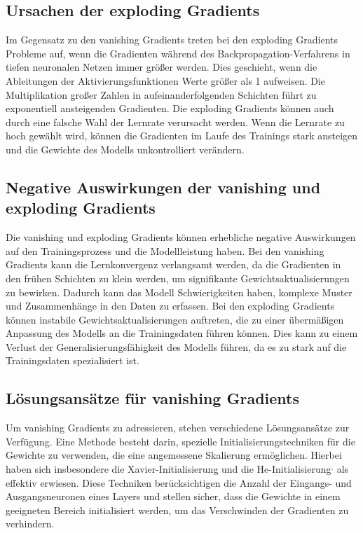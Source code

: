 \subsection{Ursachen der exploding Gradients}

    Im Gegensatz zu den vanishing Gradients treten bei den exploding Gradients Probleme auf, wenn die Gradienten während des Backpropagation-Verfahrens in tiefen neuronalen Netzen immer größer werden. 
    Dies geschieht, wenn die Ableitungen der Aktivierungsfunktionen Werte größer als 1 aufweisen. Die Multiplikation großer Zahlen in aufeinanderfolgenden Schichten führt zu exponentiell ansteigenden Gradienten.
    Die exploding Gradients können auch durch eine falsche Wahl der Lernrate verursacht werden. 
    Wenn die Lernrate zu hoch gewählt wird, können die Gradienten im Laufe des Trainings stark ansteigen und die Gewichte des Modells unkontrolliert verändern.

\subsection{Negative Auswirkungen der vanishing und exploding Gradients}

    Die vanishing und exploding Gradients können erhebliche negative Auswirkungen auf den Trainingsprozess und die Modellleistung haben. 
    Bei den vanishing Gradients kann die Lernkonvergenz verlangsamt werden, da die Gradienten in den frühen Schichten zu klein werden, um signifikante Gewichtsaktualisierungen zu bewirken. 
    Dadurch kann das Modell Schwierigkeiten haben, komplexe Muster und Zusammenhänge in den Daten zu erfassen.
    Bei den exploding Gradients können instabile Gewichtsaktualisierungen auftreten, die zu einer übermäßigen Anpassung des Modells an die Trainingsdaten führen können. 
    Dies kann zu einem Verlust der Generalisierungsfähigkeit des Modells führen, da es zu stark auf die Trainingsdaten spezialisiert ist.

\subsection{Lösungsansätze für vanishing Gradients}

    Um vanishing Gradients zu adressieren, stehen verschiedene Lösungsansätze zur Verfügung. 
    Eine Methode besteht darin, spezielle Initialisierungstechniken für die Gewichte zu verwenden, die eine angemessene Skalierung ermöglichen. 
    Hierbei haben sich insbesondere die Xavier-Initialisierung und die He-Initialisierung$^{,}$ als effektiv erwiesen. 
    Diese Techniken berücksichtigen die Anzahl der Eingangs- und Ausgangsneuronen eines Layers und stellen sicher, dass die Gewichte in einem geeigneten Bereich initialisiert werden, um das Verschwinden der Gradienten zu verhindern.
    
